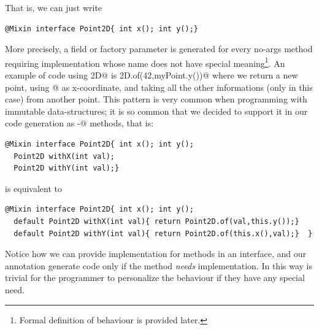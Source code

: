 That is, we can just write
\begin{lstlisting}
@Mixin interface Point2D{ int x(); int y();}
\end{lstlisting}

More precisely, a field or factory parameter is generated for every no-args method requiring implementation whose name does not have special meaning\footnote{Formal definition of \mixin behaviour is provided later.}.
An example of code using \Q@Point2D@ is 
\Q@Point2D.of(42,myPoint.y())@
where we return a new point, using @ as x-coordinate, and 
taking all the other informations (only \Q@y@ in this case) from another point.
This pattern is very common when programming with immutable data-structures; it is so common that we decided to support it in our code generation as \Q@with-@ methods, that is:
\begin{lstlisting}
@Mixin interface Point2D{ int x(); int y();
  Point2D withX(int val); 
  Point2D withY(int val);}
\end{lstlisting}
is equivalent to 
\begin{lstlisting}
@Mixin interface Point2D{ int x(); int y();
  default Point2D withX(int val){ return Point2D.of(val,this.y());}
  default Point2D withY(int val){ return Point2D.of(this.x(),val);}  }
\end{lstlisting}
Notice how we can provide implementation for methods in an interface, 
and our annotation generate code only if the method \emph{needs} implementation. In this way is trivial for the programmer to personalize the behaviour if they have any special need.





